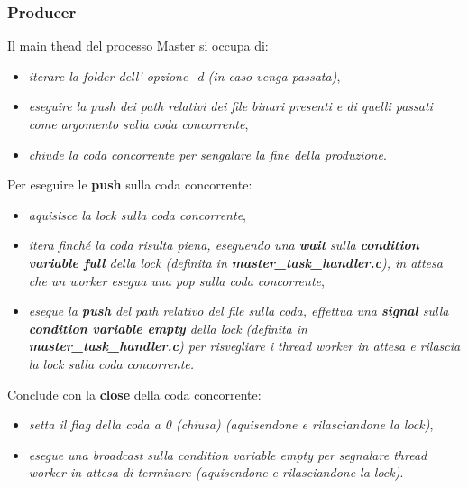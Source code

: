 \documentclass{article}
\begin{document}
\subsubsection{Producer}
Il main thead del processo Master si occupa di:
\begin{itemize}
    \itemsep 0em
    \item \textit{iterare la folder dell' opzione -d (in caso venga passata)},
    \item \textit{eseguire la push dei path relativi dei file binari presenti e di quelli passati come argomento sulla coda concorrente},
    \item \textit{chiude la coda concorrente per sengalare la fine della produzione}.
\end{itemize}
Per eseguire le \textbf{push} sulla coda concorrente:
\begin{itemize}
    \itemsep 0em
    \item \textit{aquisisce la lock sulla coda concorrente},
    \item \textit{itera finché la coda risulta piena, eseguendo una \textbf{wait} sulla \textbf{condition variable full} della lock (definita in \textbf{\textit{master\_task\_handler.c}}), in attesa che un worker esegua una pop sulla coda concorrente},
    \item \textit{esegue la \textbf{push} del path relativo del file sulla coda, effettua una \textbf{signal} sulla \textbf{condition variable empty} della lock (definita in \textbf{\textit{master\_task\_handler.c}}) per risvegliare i thread worker in attesa e rilascia la lock sulla coda concorrente.}
\end{itemize}

Conclude con la \textbf{close} della coda concorrente:
\begin{itemize}
    \itemsep 0em
    \item \textit{setta il flag della coda a 0 (chiusa) (aquisendone e rilasciandone la lock)},
    \item \textit{esegue una broadcast sulla condition variable empty per segnalare thread worker in attesa di terminare (aquisendone e rilasciandone la lock)}.
\end{itemize}
\end{document}
